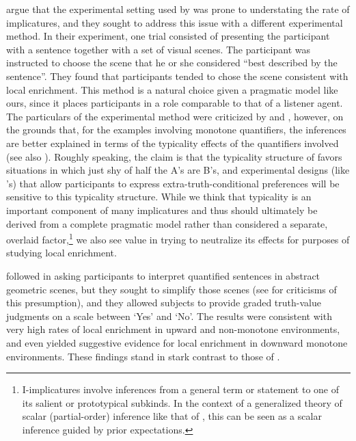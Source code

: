 \documentclass[leqno,12pt]{article}
\begin{document}
\citet{Clifton:Dube:2010} argue that the experimental setting used by
\citeauthor{Geurts:Pouscoulous:2009} was prone to understating the
rate of implicatures, and they sought to address this issue with a
different experimental method.  In their experiment, one trial
consisted of presenting the participant with a sentence together with
a set of visual scenes.  The participant was instructed to choose the
scene that he or she considered ``best described by the sentence''.
They found that participants tended to chose the scene consistent with
local enrichment. This method is a natural choice given a pragmatic
model like ours, since it places participants in a role comparable to
that of a listener agent. The particulars of the experimental method
were criticized by  and
\citet{vanTiel:2014}, however, on the grounds that, for the examples
involving monotone quantifiers, the inferences are better explained in
terms of the typicality effects of the quantifiers involved (see also
\citealp{Degen:Tanenhaus:2014}).  Roughly speaking, the claim is that
the typicality structure of  favors situations in
which just shy of half the A's are B's, and experimental designs (like
\citeauthor{Clifton:Dube:2010}'s) that allow participants to express
extra-truth-conditional preferences will be sensitive to this
typicality structure. While we think that typicality is an important
component of many implicatures and thus should ultimately be derived
from a complete pragmatic model rather than considered a separate,
overlaid factor,\footnote{ I-implicatures
  involve inferences from a general term or statement to one of its
  salient or prototypical subkinds. In the context of a generalized
  theory of scalar (partial-order) inference like that of
  \citet{Hirschberg85}, this can be seen as a scalar inference guided
  by prior expectations.} we also see value in trying to
neutralize its effects for purposes of studying local enrichment.

\citet{Chemla:Spector:2011} followed \citet{Geurts:Pouscoulous:2009}
in asking participants to interpret quantified sentences in abstract
geometric scenes, but they sought to simplify those scenes (see
 for criticisms of this
presumption), and they allowed subjects to provide graded truth-value
judgments on a scale between `Yes' and `No'. The results were
consistent with very high rates of local enrichment in upward and
non-monotone environments, and even yielded suggestive evidence for
local enrichment in downward monotone environments. These findings
stand in stark contrast to those of \citet{Geurts:Pouscoulous:2009}.
\end{document}
